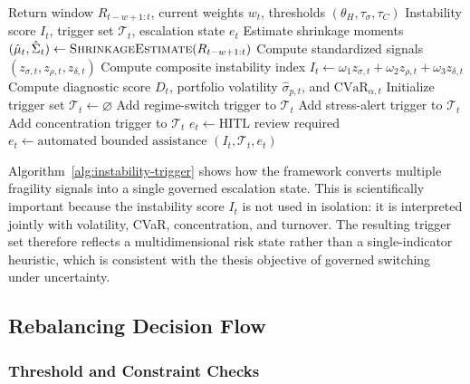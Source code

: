 \documentclass[11pt]{article}
\begin{document}
\begin{algorithm}[htbp]
\caption{Instability Detection, Trigger Activation, and Escalation}
\label{alg:instability-trigger}
\begin{algorithmic}[1]
\Require Return window $R_{t-w+1:t}$, current weights $w_t$, thresholds $(\theta_H, \tau_{\sigma}, \tau_C)$
\Ensure Instability score $I_t$, trigger set $\mathcal{T}_t$, escalation state $e_t$
\State Estimate shrinkage moments $(\hat{\mu}_t, \hat{\Sigma}_t) \leftarrow \textsc{ShrinkageEstimate}(R_{t-w+1:t})$
\State Compute standardized signals $(z_{\sigma,t}, z_{\rho,t}, z_{\delta,t})$
\State Compute composite instability index $I_t \leftarrow \omega_1 z_{\sigma,t} + \omega_2 z_{\rho,t} + \omega_3 z_{\delta,t}$
\State Compute diagnostic score $D_t$, portfolio volatility $\hat{\sigma}_{p,t}$, and $\mathrm{CVaR}_{\alpha,t}$
\State Initialize trigger set $\mathcal{T}_t \leftarrow \varnothing$
    \State Add regime-switch trigger to $\mathcal{T}_t$
\EndIf
{}
    \State Add stress-alert trigger to $\mathcal{T}_t$
\EndIf
{}
    \State Add concentration trigger to $\mathcal{T}_t$
\EndIf
{}
    \State $e_t \leftarrow \text{HITL review required}$
\Else
    \State $e_t \leftarrow \text{automated bounded assistance}$
\EndIf
\State \Return $(I_t, \mathcal{T}_t, e_t)$
\end{algorithmic}
\end{algorithm}

Algorithm~\ref{alg:instability-trigger} shows how the framework converts multiple fragility signals into a single governed escalation state. This is scientifically important because the instability score $I_t$ is not used in isolation: it is interpreted jointly with volatility, CVaR, concentration, and turnover. The resulting trigger set therefore reflects a multidimensional risk state rather than a single-indicator heuristic, which is consistent with the thesis objective of governed switching under uncertainty.

\subsection{Rebalancing Decision Flow}
\label{sec:rebalancing}

\subsubsection{Threshold and Constraint Checks}
\end{document}
